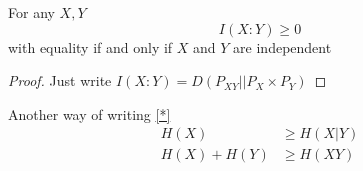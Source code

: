 \begin{coro}
For any $X,Y$
\begin{equation}
\tag{*}\label{*}
I(X:Y)\geq 0
\end{equation}
with equality if and only if $X$ and $Y$ are independent
\end{coro}

\begin{proof}
Just write $I(X:Y)=D(P_{XY}||P_X\times P_Y)$
\end{proof}

Another way of writing \eqref{*}
\begin{align*}
H(X) & \geq H(X|Y)\\
H(X)+H(Y) & \geq H(XY)
\end{align*}
